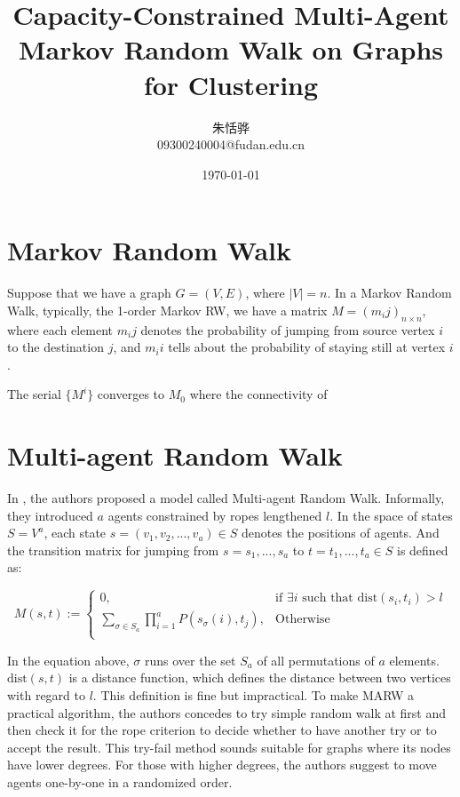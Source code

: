 \documentclass[12pt,a4paper]{article}
\begin{document}
\begin{CJK*}{UTF8}{song}

\title{Capacity-Constrained Multi-Agent Markov Random Walk on Graphs for Clustering}
\author{朱恬骅 \\
\small{09300240004@fudan.edu.cn}}
\date{\today}
\maketitle

\section{Markov Random Walk}
Suppose that we have a graph $G=(V, E)$, where $|V| = n$. In a Markov Random Walk, typically, the 1-order Markov RW, we have a matrix $M = (m_ij)_{n \times n}$, where each element $m_ij$ denotes the probability of jumping from source vertex $i$ to the destination $j$, and $m_ii$ tells about the probability of staying still at vertex $i$.

The serial $\{M^i\}$ converges to $M_0$ where the connectivity of 


\section{Multi-agent Random Walk}
In \cite{Alamgir:2010:MRW:1933307.1934543}, the authors proposed a model called Multi-agent Random Walk. Informally, they introduced $a$ agents constrained by ropes lengthened $l$. In the space of states $S = V^a$, each state $s = (v_1, v_2, ..., v_a) \in S$ denotes the positions of agents. And the transition matrix for jumping from $s = {s_1, ..., s_a}$ to $t = {t_1, ..., t_a} \in S$ is defined as:

\begin{equation}
M(s, t) := \left\{
    \begin{array}{ll}
        0, & \text{if } \exists i \text{ such that dist}(s_i, t_i) > l \\
        \sum_{\sigma \in S_a}{\prod\limits_{i=1}^{a}{P(s_\sigma(i), t_j)}}, & \text{Otherwise} \\
    \end{array}
    \right.
\end{equation}

In the equation above, $\sigma$ runs over the set $S_a$ of all permutations of $a$ elements. $\text{dist}(s, t)$ is a distance function, which defines the distance between two vertices with regard to $l$. This definition is fine but impractical. To make MARW a practical algorithm, the authors concedes to try simple random walk at first and then check it for the rope criterion to decide whether to have another try or to accept the result. This try-fail method sounds suitable for graphs where its nodes have lower degrees. For those with higher degrees, the authors suggest to move agents one-by-one in a randomized order.


\end{CJK*}
\end{document}
